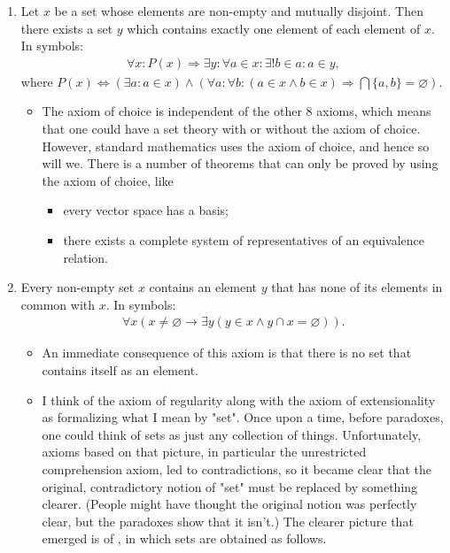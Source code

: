 \documentclass{article}
\begin{document}
\begin{enumerate}
\item {} Let $x$ be a set whose elements are non-empty and mutually disjoint. Then there exists a set $y$ which contains exactly one element of each element of $x$. In symbols:
\begin{align*}
\forall x: P(x) \Rightarrow \exists y: \forall a \in x: \exists ! b \in a: a \in y,
\end{align*}
where $P(x) \Leftrightarrow(\exists a: a \in x) \wedge(\forall a: \forall b:(a \in x \wedge b \in x) \Rightarrow \bigcap\{a, b\}=\varnothing)$.
\begin{itemize}
    \item The axiom of choice is independent of the other 8 axioms, which means that one could have a set theory with or without the axiom of choice. However, standard mathematics uses the axiom of choice, and hence so will we. There is a number of theorems that can only be proved by using the axiom of choice, like
    \begin{itemize}[$\ast$]
        \item every vector space has a basis;
        \item there exists a complete system of representatives of an equivalence relation.
    \end{itemize}
\end{itemize}
\item {} Every non-empty set $x$ contains an element $y$ that has none of its elements in common with $x$. In symbols:
\begin{align*}
\forall x(x \neq \varnothing \rightarrow \exists y(y \in x \wedge y \cap x=\varnothing)) .
\end{align*}
\begin{itemize}
    \item An immediate consequence of this axiom is that there is no set that contains itself as an element.
    \item {\tiny I think of the axiom of regularity along with the axiom of extensionality as formalizing what I mean by "set". Once upon a time, before paradoxes, one could think of sets as just any collection of things. Unfortunately, axioms based on that picture, in particular the unrestricted comprehension axiom, led to contradictions, so it became clear that the original, contradictory notion of "set" must be replaced by something clearer. (People might have thought the original notion was perfectly clear, but the paradoxes show that it isn't.) The clearer picture that emerged is of , in which sets are obtained as follows.
    
}
\end{itemize}
\end{enumerate}
\end{document}
